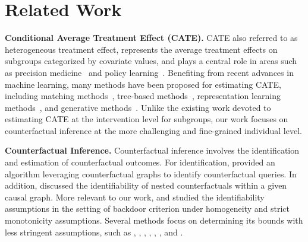 \section{Related Work}
{\bf Conditional Average Treatment Effect (CATE).} 
 CATE also referred to as heterogeneous treatment effect, represents the average treatment effects on subgroups categorized by covariate values, and plays a central role in areas such as precision medicine~\cite{Kosorok+Laber:2019} and policy learning~\cite{Dudik2011-ICML}. Benefiting from recent advances in machine learning, many methods have been proposed for estimating CATE, including matching methods~\cite{rosenbaum1983central,schwab2018perfect,yao2018representation}, tree-based methods~\cite{chipman2010bart,wager2018estimation}, representation learning methods~\cite{johansson2016learning,shalit2017estimating,shi2019adapting,wu2022learning,wang2023optimal}, and generative methods~\cite{louizos2017causal,yoon2018ganite}. Unlike the existing work devoted to estimating CATE at the intervention level for subgroups, our work focuses on counterfactual inference at the more challenging and fine-grained individual level.
 
 
{\bf Counterfactual Inference.} Counterfactual inference involves the identification and estimation of counterfactual outcomes.
  For identification,  \citet{Shpitser2007-UAI} provided an algorithm  leveraging counterfactual graphs to identify counterfactual queries. In addition, \citet{Correa2021-NIPS} discussed the identifiability of nested counterfactuals within a given causal graph. 
 More relevant to our work, 
  \citet{Lu-etal2020-attribution} and  \citet{Xie-etal2023-attribution} studied the identifiability assumptions in the setting of backdoor criterion under homogeneity and
strict monotonicity assumptions. 
Several methods focus on determining its bounds with less stringent assumptions, such as  \citet{Bakle-1994-UAI}, \citet{Tian2000}, \citet{pearl2009causality}, \citet{Pearl-etal2016-primer}, \citet{Finkelstein-2020-UAI}, \citet{Zhang-2022-ICML}, and \citet{Melnychuk2023}.  

